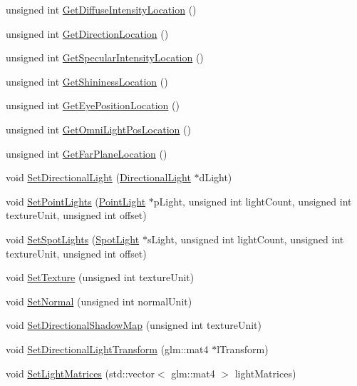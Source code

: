 \begin{DoxyCompactItemize}
unsigned int \mbox{\hyperlink{class_shader_a7edd89ea4e53cae7314bf7b7efe6beee}{Get\+Diffuse\+Intensity\+Location}} ()
\item 
unsigned int \mbox{\hyperlink{class_shader_a908960431732c32040f627776e93d780}{Get\+Direction\+Location}} ()
\item 
unsigned int \mbox{\hyperlink{class_shader_af1fcfdae96f797a6c8a278aeebbbacf8}{Get\+Specular\+Intensity\+Location}} ()
\item 
unsigned int \mbox{\hyperlink{class_shader_a5d98d713e03605ab9e2ec48f98143d39}{Get\+Shininess\+Location}} ()
\item 
unsigned int \mbox{\hyperlink{class_shader_a653eeecb7ec14c82360ea54d1c4034f3}{Get\+Eye\+Position\+Location}} ()
\item 
unsigned int \mbox{\hyperlink{class_shader_a20d72a30ea38c2af2c9c393d34b384c0}{Get\+Omni\+Light\+Pos\+Location}} ()
\item 
unsigned int \mbox{\hyperlink{class_shader_a26b015dcb7ea6997ed2fbe038223ee83}{Get\+Far\+Plane\+Location}} ()
\item 
void \mbox{\hyperlink{class_shader_af613b325ed68db8b9922a07c7787cbbb}{Set\+Directional\+Light}} (\mbox{\hyperlink{class_directional_light}{Directional\+Light}} $\ast$d\+Light)
\item 
void \mbox{\hyperlink{class_shader_a784945b66ebe106fc2fa554f2449390f}{Set\+Point\+Lights}} (\mbox{\hyperlink{class_point_light}{Point\+Light}} $\ast$p\+Light, unsigned int light\+Count, unsigned int texture\+Unit, unsigned int offset)
\item 
void \mbox{\hyperlink{class_shader_a5d3dc440c12bd8dd5bfb0157b880d8d5}{Set\+Spot\+Lights}} (\mbox{\hyperlink{class_spot_light}{Spot\+Light}} $\ast$s\+Light, unsigned int light\+Count, unsigned int texture\+Unit, unsigned int offset)
\item 
void \mbox{\hyperlink{class_shader_a2b3b0aead9bae64b58a2aeffa38fff6f}{Set\+Texture}} (unsigned int texture\+Unit)
\item 
void \mbox{\hyperlink{class_shader_af36c2df9b44963a5c48936a72064d524}{Set\+Normal}} (unsigned int normal\+Unit)
\item 
void \mbox{\hyperlink{class_shader_a57bd9a786383c5138c1d6497a689dd14}{Set\+Directional\+Shadow\+Map}} (unsigned int texture\+Unit)
\item 
void \mbox{\hyperlink{class_shader_a50df005f96c254f6e65642a1d51c4a28}{Set\+Directional\+Light\+Transform}} (glm\+::mat4 $\ast$l\+Transform)
\item 
void \mbox{\hyperlink{class_shader_a46742e5ff57e01ec22ec105d9e7000d3}{Set\+Light\+Matrices}} (std\+::vector$<$ glm\+::mat4 $>$ light\+Matrices)

\end{DoxyCompactItemize}
